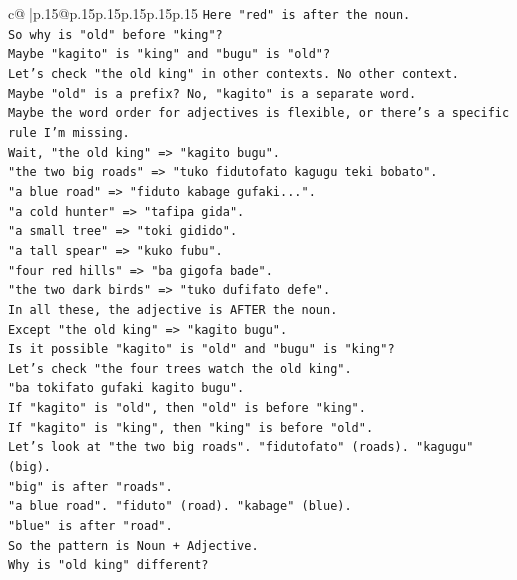 \documentclass{article}
\begin{document}
{\begin{supertabular}{c@{$\;$}|p{.15\linewidth}@{}p{.15\linewidth}p{.15\linewidth}p{.15\linewidth}p{.15\linewidth}p{.15\linewidth}}
{{{\texttt{Here "red" is after the noun.} \\
\texttt{So why is "old" before "king"?} \\
\texttt{Maybe "kagito" is "king" and "bugu" is "old"?} \\
\texttt{Let's check "the old king" in other contexts. No other context.} \\
\texttt{Maybe "old" is a prefix? No, "kagito" is a separate word.} \\
\texttt{Maybe the word order for adjectives is flexible, or there's a specific rule I'm missing.} \\
\texttt{Wait, "the old king" => "kagito bugu".} \\
\texttt{"the two big roads" => "tuko fidutofato kagugu teki bobato".} \\
\texttt{"a blue road" => "fiduto kabage gufaki...".} \\
\texttt{"a cold hunter" => "tafipa gida".} \\
\texttt{"a small tree" => "toki gidido".} \\
\texttt{"a tall spear" => "kuko fubu".} \\
\texttt{"four red hills" => "ba gigofa bade".} \\
\texttt{"the two dark birds" => "tuko dufifato defe".} \\
\texttt{In all these, the adjective is AFTER the noun.} \\
\texttt{Except "the old king" => "kagito bugu".} \\
\texttt{Is it possible "kagito" is "old" and "bugu" is "king"?} \\
\texttt{Let's check "the four trees watch the old king".} \\
\texttt{"ba tokifato gufaki kagito bugu".} \\
\texttt{If "kagito" is "old", then "old" is before "king".} \\
\texttt{If "kagito" is "king", then "king" is before "old".} \\
\texttt{Let's look at "the two big roads". "fidutofato" (roads). "kagugu" (big).} \\
\texttt{"big" is after "roads".} \\
\texttt{"a blue road". "fiduto" (road). "kabage" (blue).} \\
\texttt{"blue" is after "road".} \\
\texttt{So the pattern is Noun + Adjective.} \\
\texttt{Why is "old king" different?} \\
}}}
\end{supertabular}}
\end{document}
